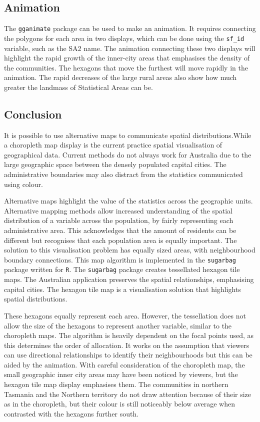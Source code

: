 \hypertarget{animation}{%
\subsection{Animation}\label{animation}}

The \texttt{gganimate} \citep{gganimate} package can be used to make an
animation. It requires connecting the polygons for each area in two
displays, which can be done using the \texttt{sf\_id} variable, such as
the SA2 name. The animation connecting these two displays will highlight
the rapid growth of the inner-city areas that emphasises the density of
the communities. The hexagons that move the furthest will move rapidly
in the animation. The rapid decreases of the large rural areas also show
how much greater the landmass of Statistical Areas can be.

\hypertarget{conclusion-03}{%
\subsection{Conclusion}\label{conclusion-03}}

It is possible to use alternative maps to communicate spatial
distributions.While a choropleth map display is the current practice
spatial visualisation of geographical data. Current methods do not
always work for Australia due to the large geographic space between the
densely populated capital cities. The administrative boundaries may also
distract from the statistics communicated using colour.

Alternative maps highlight the value of the statistics across the
geographic units. Alternative mapping methods allow increased
understanding of the spatial distribution of a variable across the
population, by fairly representing each administrative area. This
acknowledges that the amount of residents can be different but
recognises that each population area is equally important. The solution
to this visualisation problem has equally sized areas, with
neighbourhood boundary connections. This map algorithm is implemented in
the \texttt{sugarbag} \citep{sugarbag} package written for \texttt{R}.
The \texttt{sugarbag} package creates tessellated hexagon tile maps. The
Australian application preserves the spatial relationships, emphasising
capital cities. The hexagon tile map is a visualisation solution that
highlights spatial distributions.

These hexagons equally represent each area. However, the tessellation
does not allow the size of the hexagons to represent another variable,
similar to the choropleth maps. The algorithm is heavily dependent on
the focal points used, as this determines the order of allocation. It
works on the assumption that viewers can use directional relationships
to identify their neighbourhoods but this can be aided by the animation.
With careful consideration of the choropleth map, the small geographic
inner city areas may have been noticed by viewers, but the hexagon tile
map display emphasises them. The communities in northern Tasmania and
the Northern territory do not draw attention because of their size as in
the choropleth, but their colour is still noticeably below average when
contrasted with the hexagons further south.

